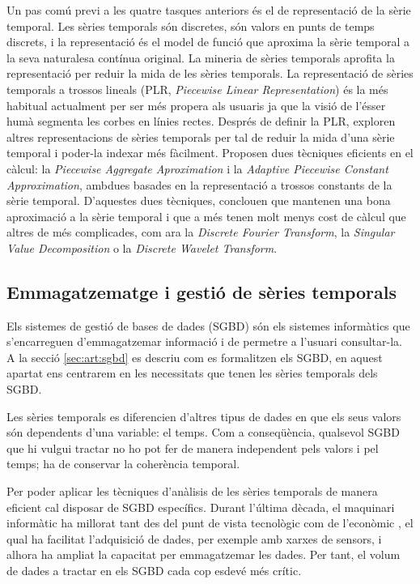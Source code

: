 Un pas comú previ a les quatre tasques anteriors és el de representació de la sèrie temporal. Les sèries temporals són discretes, són valors en punts de temps discrets, i la representació és el model de funció que aproxima la sèrie temporal a la seva naturalesa contínua original. La mineria de sèries temporals aprofita la representació per reduir la mida de les sèries temporals.
La representació de sèries temporals a trossos lineals (PLR, \emph{Piecewise Linear Representation}) \parencite{keogh97,keogh98} {é}s la més habitual actualment per ser més propera als usuaris ja que la visió de l'ésser humà segmenta les corbes en línies rectes.
Després de definir la PLR, \textcite{keogh00,keogh01} exploren altres representacions de sèries temporals per tal de reduir la mida d'una sèrie temporal i poder-la indexar més fàcilment. Proposen dues tècniques eficients en el càlcul: la \emph{Piecewise Aggregate Aproximation} i la \emph{Adaptive Piecewise Constant Approximation}, ambdues basades en la representació a trossos constants de la sèrie temporal. 
D'aquestes dues tècniques, \citeauthor{keogh00,keogh01} conclouen que mantenen una bona aproximació a la sèrie temporal i que a més  tenen molt menys cost de càlcul que altres de més complicades, com ara la \emph{Discrete Fourier Transform},  la  \emph{Singular Value Decomposition} o la \emph{Discrete Wavelet Transform}.







\subsection{Emmagatzematge i gestió de sèries temporals}


Els sistemes de gestió de bases de dades (SGBD) són els sistemes informàtics que s'encarreguen d'emmagatzemar informació i de permetre a l'usuari consultar-la. A la secció \ref{sec:art:sgbd} es descriu com es formalitzen els SGBD, en aquest apartat ens centrarem en les necessitats que tenen les sèries temporals dels SGBD.


Les sèries temporals es diferencien d'altres tipus de dades en que els seus valors són dependents d'una variable: el temps. Com a conseqüència, qualsevol SGBD que hi vulgui tractar no ho pot fer de manera independent pels valors i pel temps; ha de conservar la coherència temporal.

Per poder aplicar les tècniques d'anàlisis de les sèries temporals de manera eficient cal disposar de SGBD específics. 
Durant l'última dècada, el maquinari informàtic ha millorat tant des del punt de vista tecnològic com de l'econòmic \parencite{deligiannakis07}, el qual ha facilitat l'adquisició de dades, per exemple amb xarxes de sensors, i alhora ha ampliat la capacitat per emmagatzemar les dades. 
Per tant, el volum de dades a tractar  en els SGBD cada cop esdevé més crític.

